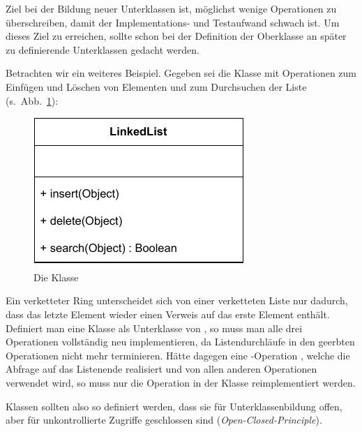 \vspace{\baselineskip} %
\vspace{\baselineskip} %

Ziel bei der Bildung neuer Unterklassen ist, möglichst wenige Operationen zu überschreiben, damit der Implementations- und Testaufwand schwach ist. Um dieses Ziel zu erreichen, sollte schon bei der Definition der Oberklasse an später zu definierende Unterklassen gedacht werden.

Betrachten wir ein weiteres Beispiel. Gegeben sei die Klasse  mit Operationen zum Einfügen und Löschen von Elementen und zum Durchsuchen der Liste (s.~Abb.~\ref{fig:linked_list}):

\pagebreak %

\vspace*{\baselineskip} %

\begin{figure}[h!]
	\centering
	\includegraphics{Bilder/Kapitel-9/linked_list.pdf}
	\vspace{\baselineskip} %
	\caption{Die Klasse }
	\label{fig:linked_list}
\end{figure}

\vspace{\baselineskip} %

Ein verketteter Ring unterscheidet sich von einer verketteten Liste nur dadurch, dass das letzte Element wieder einen Verweis auf das erste Element enthält. Definiert man eine Klasse  als Unterklasse von , so muss man alle drei Operationen vollständig neu implementieren, da Listendurchläufe in den geerbten Operationen nicht mehr terminieren. Hätte  dagegen eine -Operation , welche die Abfrage auf das Listenende realisiert und von allen anderen Operationen verwendet wird, so muss nur die Operation  in der Klasse  reimplementiert werden.

Klassen sollten also so definiert werden, dass sie für Unterklassenbildung offen, aber für unkontrollierte Zugriffe geschlossen sind (\textit{Open-Closed-Principle}).